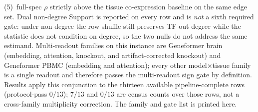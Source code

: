 \documentclass[fleqn,10pt,lineno]{wlpeerj}
\begin{document}
(5)~full-spec $\rho$ strictly above the tissue co-expression baseline on the same edge set.
Dual non-degree Support is reported on every row and is \emph{not} a sixth required gate: under
non-degree the row-shuffle still preserves TF out-degree while the statistic does not condition on
degree, so the two nulls do not address the same estimand. Multi-readout families on this instance
are Geneformer brain (embedding, attention, knockout, and artifact-corrected knockout) and
Geneformer PBMC (embedding and attention); every other model$\times$tissue family is a single
readout and therefore passes the multi-readout sign gate by definition. Results apply this
conjunction to the thirteen available pipeline-complete rows (protocol-pass $0/13$); $7/13$ and $0/13$
are census counts over those rows, not a cross-family multiplicity correction.
The family and gate list is printed here.
\end{document}
